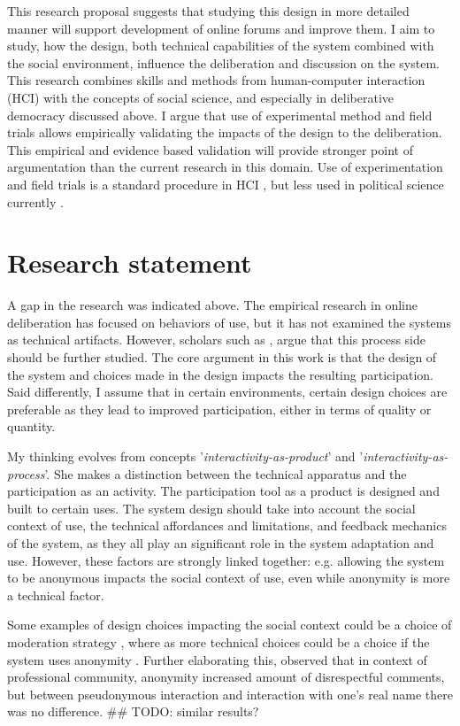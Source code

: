 \documentclass{article}
\begin{document}
This research proposal suggests that studying this design in more detailed manner will support development of online forums and improve them. I aim to study, how the design, both technical capabilities of the system combined with the social environment, influence the deliberation and discussion on the system. This research combines skills and methods from human-computer interaction (HCI) with the concepts of social science, and especially in deliberative democracy discussed above. I argue that use of experimental method and field trials allows empirically validating the impacts of the design to the deliberation. This empirical and evidence based validation will provide stronger point of argumentation than the current research in this domain. Use of experimentation and field trials is a standard procedure in HCI , but less used in political science currently .

\section{Research statement}

A gap in the research was indicated above. The empirical research in online deliberation has focused on behaviors of use, but it has not examined the systems as technical artifacts. However, scholars such as , argue that this process side should be further studied. The core argument in this work is that the design of the system and choices made in the design impacts the resulting participation. Said differently, I assume that in certain environments, certain design choices are preferable as they lead to improved participation, either in terms of quality or quantity.

My thinking evolves from  concepts '\textit{interactivity-as-product}' and '\textit{interactivity-as-process}'. She makes a distinction between the technical apparatus and the participation as an activity. The participation tool as a product is designed and built to certain uses. The system design should take into account the social context of use, the technical affordances and limitations, and feedback mechanics of the system, as they all play an significant role in the system adaptation and use. However, these factors are strongly linked together: e.g. allowing the system to be anonymous impacts the social context of use, even while anonymity is more a technical factor.

Some examples of design choices impacting the social context could be a choice of moderation strategy \cite{wright07}, where as more technical choices could be a choice if the system uses anonymity \cite{kilner05}. Further elaborating this,  observed that in context of professional community, anonymity increased amount of disrespectful comments, but between pseudonymous interaction and interaction with one's real name there was no difference. ## TODO: similar results?
\end{document}
